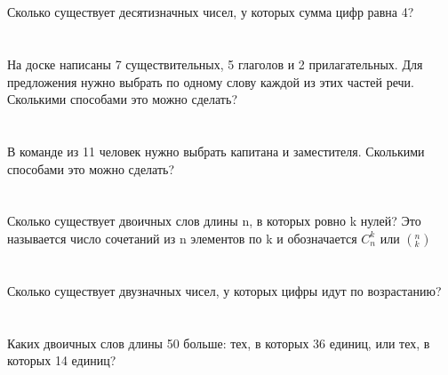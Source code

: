 \documentclass{article}%
\begin{document}
%
\section{}%
\label{sec:}%
Сколько существует десятизначных чисел, у которых сумма цифр равна 4?%
%
\iffalse%
Автор: 25 школа%
Дата: 01{-}07{-}2017%
Название: None%
Подсказка: \textbackslash{}\textbackslash{}%
nan%
\fi

%
\section{}%
\label{sec:}%
На доске написаны 7 существительных, 5 глаголов и 2 прилагательных. Для предложения нужно выбрать по одному слову каждой из этих частей речи. Сколькими способами это можно сделать?%
%
\iffalse%
Автор: Ираклий Гагуа%
Дата: 07{-}01{-}2011%
Название: None%
Подсказка: \textbackslash{}\textbackslash{}%
nan%
\fi

%
\section{}%
\label{sec:}%
В команде из 11 человек нужно выбрать капитана и заместителя. Сколькими способами это можно сделать?%
%
\iffalse%
Автор: Ираклий Гагуа%
Дата: 07{-}01{-}2011%
Название: None%
Подсказка: \textbackslash{}\textbackslash{}%
nan%
\fi

%
\section{}%
\label{sec:}%
Сколько существует двоичных слов длины n, в которых ровно k нулей? Это называется число сочетаний из n элементов по k и обозначается $C_n^k$ или $(^n_k)$%
%
\iffalse%
Автор: Ираклий Гагуа%
Дата: 07{-}01{-}2011%
Название: None%
Подсказка: \textbackslash{}\textbackslash{}%
nan%
\fi

%
\section{}%
\label{sec:}%
Сколько существует двузначных чисел, у которых цифры идут по возрастанию?%
%
\iffalse%
Автор: Ираклий Гагуа%
Дата: 07{-}01{-}2011%
Название: None%
Подсказка: \textbackslash{}\textbackslash{}%
nan%
\fi

%
\section{}%
\label{sec:}%
Каких двоичных слов длины 50 больше: тех, в которых 36 единиц, или тех, в которых 14 единиц?%
%
\iffalse%
Автор: Ираклий Гагуа%
Дата: 07{-}01{-}2011%
Название: None%
Подсказка: \textbackslash{}\textbackslash{}%
nan%
\fi
\end{document}
